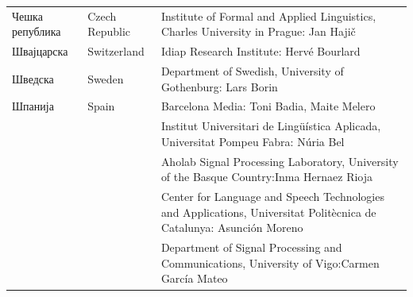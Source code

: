 \begin{longtable}{llp{114mm}}
  Чешка република & \textcolor{grey1}{Czech Republic} & Institute of Formal and Applied Linguistics, Charles University in Prague: Jan Hajič \\ \addlinespace
  Швајцарска & \textcolor{grey1}{Switzerland} & Idiap Research Institute: Hervé Bourlard \\ \addlinespace 
  Шведска & \textcolor{grey1}{Sweden} & Department of Swedish, University of Gothenburg: Lars Borin \\ \addlinespace 
  Шпанија &  \textcolor{grey1}{Spain} & Barcelona Media: Toni Badia, Maite Melero \\ \addlinespace 
  & & Institut Universitari de Lingüística Aplicada, Universitat Pompeu Fabra: Núria Bel \\ \addlinespace 
  & & Aholab Signal Processing Laboratory, University of the Basque Country:\newline Inma Hernaez Rioja \\ \addlinespace 
  & & Center for Language and Speech Technologies and Applications, Universitat Politècnica de Catalunya:  Asunción Moreno \\ \addlinespace 
  & & Department of Signal Processing and Communications, University of Vigo:\newline Carmen García Mateo  
    
\end{longtable}
\normalsize

\renewcommand*{\figureformat}{}
\renewcommand*{\captionformat}{}

